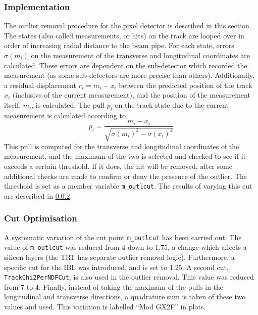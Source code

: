 \subsubsection{Implementation}
The outlier removal procedure for the pixel detector is described in this section. The states (also called measurements, or hits) on the track are looped over in order of increasing radial distance to the beam pipe. For each state, errors $\sigma(m_i)$ on the measurement of the transverse and longitudinal coordinates are calculated. These errors are dependent on the sub-detector which recorded the measurement (as some sub-detectors are more precise than others). Additionally, a residual displacement $r_i = m_i - x_i$ between the predicted position of the track $x_i$ (inclusive of the current measurement), and the position of the measurement itself, $m_i$, is calculated. The pull $p_i$ on the track state due to the current measurement is calculated according to
%
\begin{equation}
    p_i = \frac{m_i - x_i}{\sqrt{\sigma(m_i)^2 - \sigma(x_i)^2}}
\end{equation}
%
This pull is computed for the transverse and longitudinal coordinates of the measurement, and the maximum of the two is selected and checked to see if it exceeds a certain threshold. If it does, the hit will be removed, after some additional checks are made to confirm or deny the presence of the outlier. The threshold is set as a member variable \texttt{m\_outlcut}. The results of varying this cut are described in \cref{sec:cut opt}.


\subsubsection{Cut Optimisation}\label{sec:cut opt}
A systematic variation of the cut point \texttt{m\_outlcut} has been carried out. The value of \texttt{m\_outlcut} was reduced from 4 down to 1.75, a change which affects a silicon layers (the TRT has separate outlier removal logic). Furthermore, a specific cut for the IBL was introduced, and is set to 1.25. A second cut, \texttt{TrackChi2PerNDFCut}, is also used in the outlier removal. This value was reduced from 7 to 4. Finally, instead of taking the maximum of the pulls in the longitudinal and transverse directions, a quadrature sum is taken of these two values and used. This variation is labelled ``Mod GX2F'' in plots.

